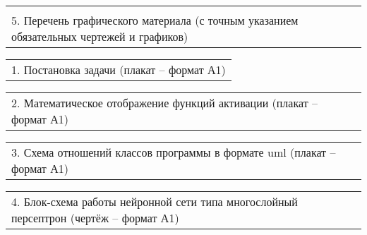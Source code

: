 \documentclass[12pt, А4, twoside]{article}
\begin{document}
\begin{FlushLeft}
		
		
		\begin{tabular}{p{17.25cm}}
			\vspace{0pt} \hline \\
			\textsf{5. Перечень графического материала (с точным указанием обязательных чертежей и графиков)} \vspace{0pt} \hline \\
		\end{tabular}
		
		\vspace{-0.1 cm}
		
		\begin{tabular}{p{17.25cm}}
			\hspace{0.3cm} \textsf{1. Постановка задачи (плакат {--} формат А1)} \vspace{0pt} \hline  \\
		\end{tabular}
		
		\vspace{-0.1 cm}
		
		\begin{tabular}{p{17.25cm}}
			\hspace{0.3cm} \textsf{2. Математическое отображение функций активации (плакат {--} формат А1)} \vspace{0pt} \hline  \\
		\end{tabular}
		
		\vspace{-0.1 cm}
		
		\begin{tabular}{p{17.25cm}}
			\hspace{0.3cm} \textsf{3. Схема отношений классов программы в формате uml (плакат {--} формат А1)} \vspace{0pt} \hline  \\
		\end{tabular}
		
		\vspace{-0.1 cm}
		
		\begin{tabular}{p{17.25cm}}
			\hspace{0.3cm} \textsf{4. Блок-схема работы нейронной сети типа многослойный персептрон (чертёж {--} формат А1)} \vspace{0pt} \hline  \\
		\end{tabular}
		

\end{FlushLeft}
\end{document}
